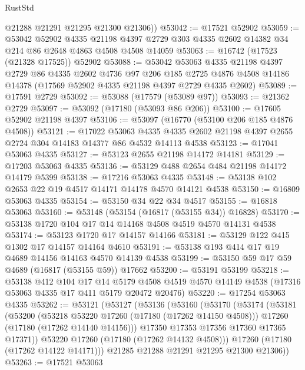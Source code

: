 \begin{lexlean}{RustStd}
\begin{coremodule}
        @21288
        @21291
        @21295
        @21300
        @21306))
@53042 := @17521 @52902
@53059 := @53042
    @52902
    @4335
    @21198
    @4397
    @2729
    @303
    @4335
    @2602
    @14382
    @34
    @214
    @86
    @2648
    @4863
    @4508
    @4508
    @14059
@53063 := @16742 (@17523 (@21328 @17525)) @52902
@53088 := @53042
    @53063
    @4335
    @21198
    @4397
    @2729
    @86
    @4335
    @2602
    @4736
    @97
    @206
    @185
    @2725
    @4876
    @4508
    @14186
    @14378
    (@17569 @52902 @4335 @21198 @4397 @2729 @4335 @2602)
@53089 := @17591 @2729
@53092 := @53088 (@17579 (@53089 @97))
@53093 := @21362 @2729
@53097 := @53092 (@17180 (@53093 @86 @206))
@53100 := @17605 @52902 @21198 @4397
@53106 := @53097 (@16770 (@53100 @206 @185 @4876 @4508))
@53121 := @17022
    @53063
    @4335
    @4335
    @2602
    @21198
    @4397
    @2655
    @2724
    @304
    @14183
    @14377
    @86
    @4532
    @14113
    @4538
@53123 := @17041 @53063 @4335
@53127 := @53123 @2655 @21198 @14172 @14181
@53129 := @17203 @53063 @4335
@53136 := @53129 @488 @2654 @484 @21198 @14172 @14179 @5399
@53138 := @17216 @53063 @4335
@53148 := @53138 @102 @2653 @22 @19 @4517 @14171 @14178 @4570 @14121 @4538
@53150 := @16809 @53063 @4335
@53154 := @53150 @34 @22 @34 @4517
@53155 := @16818 @53063
@53160 := @53148 (@53154 (@16817 (@53155 @34)) @16828)
@53170 := @53138 @1720 @104 @17 @14 @14168 @4508 @4519 @4570 @14131 @4538
@53174 := @53123 @1720 @17 @14157 @14166
@53181 := @53129 @122 @415 @1302 @17 @14157 @14164 @4610
@53191 := @53138 @193 @414 @17 @19 @4689 @14156 @14163 @4570 @14139 @4538
@53199 := @53150 @59 @17 @59 @4689 (@16817 (@53155 @59)) @17662
@53200 := @53191 @53199
@53218 := @53138
    @412
    @104
    @17
    @14
    @5179
    @4508
    @4519
    @4570
    @14149
    @4538
    (@17316 @53063 @4335 @17 @411 @5179 @20472 @20476)
@53220 := @17254 @53063 @4335
@53262 := @53121
    (@53127
      (@53136
        (@53160
          (@53170
            (@53174
              (@53181
                (@53200
                  (@53218 @53220 @17260 (@17180 (@17262 @14150 @4508)))
                  @17260
                  (@17180 (@17262 @14140 @14156)))
                @17350
                @17353
                @17356
                @17360
                @17365
                @17371))
            @53220
            @17260
            (@17180 (@17262 @14132 @4508)))
          @17260
          (@17180 (@17262 @14122 @14171)))
        @21285
        @21288
        @21291
        @21295
        @21300
        @21306))
@53263 := @17521 @53063

\end{coremodule}
\end{lexlean}
